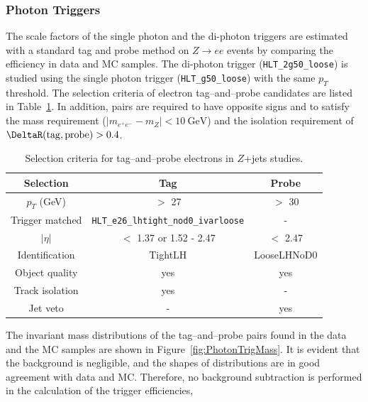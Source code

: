 \subsubsection{Photon Triggers}
\label{subsect:photonTrigEff}

The scale factors of the single photon and the di-photon triggers are estimated with a standard tag and probe method on $Z\rightarrow ee$ events by comparing the efficiency in data and MC samples. The di-photon trigger (\texttt{HLT\_2g50\_loose}) is studied using the single photon trigger (\texttt{HLT\_g50\_loose}) with the same $p_{T}$ threshold. The selection criteria of electron tag--and--probe candidates are listed in Table~\ref{tab:ZeeSelection}. In addition, pairs are required to have opposite signs and to satisfy the mass requirement ($|m_{e^{+}e^{-}} - m_{Z}| < 10~\si{\GeV}$) and the isolation requirement of $\DeltaR(\mathrm{tag}, \mathrm{probe}) > 0.4$. 

\begin{table}[!htb]
	\centering
	\begin{tabular}{ccc}
		\hline
		\hline
		Selection               & Tag                                           & Probe         \\
		\hline
		$p_{T}$ (GeV)           & $>$ 27                                        & $>$ 30        \\
		Trigger matched         & \texttt{HLT\_e26\_lhtight\_nod0\_ivarloose}   & -             \\
		$|\eta|$                & $<$ 1.37 or 1.52 - 2.47                       & $<$ 2.47      \\
		Identification          & TightLH                                       & LooseLHNoD0   \\
		Object quality          & yes                                           & yes           \\
		Track isolation         & yes                                           & -             \\
		Jet veto                & -                                             & yes           \\
		\hline
		\hline
	\end{tabular}
	\caption{Selection criteria for tag--and--probe electrons in $Z$+jets studies.}
	\label{tab:ZeeSelection}
\end{table}

The invariant mass distributions of the tag--and--probe pairs found in the data and the MC samples are shown in Figure~\ref{fig:PhotonTrigMass}. It is evident that the background is negligible, and the shapes of distributions are in good agreement with data and MC. Therefore, no background subtraction is performed in the calculation of the trigger efficiencies, 

